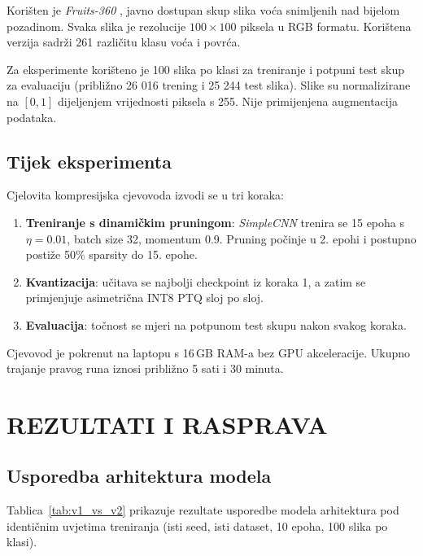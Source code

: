 \documentclass[letterpaper, 10 pt, conference]{ieeeconf}
\begin{document}
Korišten je \textit{Fruits-360} \cite{fruits360}, javno dostupan skup slika voća snimljenih nad bijelom pozadinom.
Svaka slika je rezolucije $100\times100$ piksela u RGB formatu.
Korištena verzija sadrži 261 različitu klasu voća i povrća.

Za eksperimente korišteno je 100 slika po klasi za treniranje i potpuni test skup za evaluaciju (približno 26 016 trening i 25 244 test slika).
Slike su normalizirane na $[0,1]$ dijeljenjem vrijednosti piksela s 255.
Nije primijenjena augmentacija podataka.

\subsection{Tijek eksperimenta}

Cjelovita kompresijska cjevovoda izvodi se u tri koraka:
\begin{enumerate}
  \item \textbf{Treniranje s dinamičkim pruningom}: \textit{SimpleCNN} trenira se 15 epoha s $\eta = 0.01$, batch size 32, momentum 0.9. Pruning počinje u 2. epohi i postupno postiže 50\% sparsity do 15. epohe.
  \item \textbf{Kvantizacija}: učitava se najbolji checkpoint iz koraka 1, a zatim se primjenjuje asimetrična INT8 PTQ sloj po sloj.
  \item \textbf{Evaluacija}: točnost se mjeri na potpunom test skupu nakon svakog koraka.
\end{enumerate}

Cjevovod je pokrenut na laptopu s 16\,GB RAM-a bez GPU akceleracije. Ukupno trajanje pravog runa iznosi približno 5 sati i 30 minuta.

\section{\textbf{REZULTATI I RASPRAVA}}

\subsection{Usporedba arhitektura modela}

Tablica~\ref{tab:v1_vs_v2} prikazuje rezultate usporedbe modela arhitektura pod identičnim uvjetima treniranja (isti seed, isti dataset, 10 epoha, 100 slika po klasi).
\end{document}
